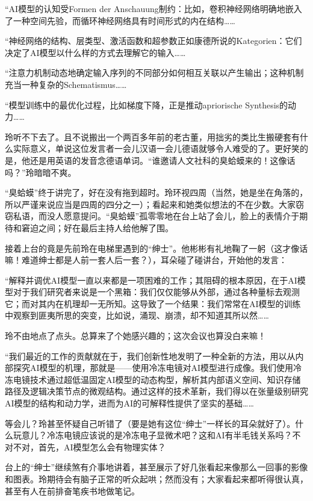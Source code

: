 “AI模型的认知受Formen der Anschauung制约：比如，卷积神经网络明确地嵌入了一种空间先验，而循环神经网络具有时间形式的内在结构……

“神经网络的结构、层类型、激活函数和超参数正如康德所说的Kategorien：它们决定了AI模型以什么样的方式去理解它的输入……

“注意力机制动态地确定输入序列的不同部分如何相互关联以产生输出；这种机制充当一种复杂的Schematismus……

“模型训练中的最优化过程，比如梯度下降，正是推动apriorische Synthesis的动力……

玲听不下去了。且不说搬出一个两百多年前的老古董，用拙劣的类比生搬硬套有什么实际意义，单说这位发言者一会儿汉语一会儿德语就够令人难受的了。更好笑的是，他还是用英语的发音念德语单词。“谁邀请人文社科的臭蛤蟆来的！这像话吗？”玲暗暗不爽。

“臭蛤蟆”终于讲完了，好在没有拖到超时。玲环视四周（当然，她是坐在角落的，所以严谨来说应当是四周的四分之一）；看起来和她类似想法的不在少数。大家窃窃私语，而没人愿意提问。“臭蛤蟆”孤零零地在台上站了会儿，脸上的表情介于期待和窘迫之间；好在最后主持人给他解了围。

接着上台的竟是先前玲在电梯里遇到的“绅士”。他彬彬有礼地鞠了一躬（这才像话嘛！难道绅士都是人前一套人后一套？），耳朵碰了碰讲台，开始他的发言：

“解释并调优AI模型一直以来都是一项困难的工作；其阻碍的根本原因，在于AI模型对于我们研究者来说是一个黑箱：我们仅仅能够从外部，通过各种量标去观测它；而对其内在机理却一无所知。这导致了一个结果：我们常常在AI模型的训练中观察到匪夷所思的突变，比如说，涌现、崩溃，却不知道其所以然……

玲不由地点了点头。总算来了个她感兴趣的；这次会议也算没白来嘛！

“我们最近的工作的贡献就在于，我们创新性地发明了一种全新的方法，用以从内部探究AI模型的机理，那就是——使用冷冻电镜对AI模型进行成像。我们使用冷冻电镜技术通过超低温固定AI模型的动态构型，解析其内部语义空间、知识存储路径及逻辑决策节点的微观结构。通过这样的技术革新，我们得以在张量级别研究AI模型的结构和动力学，进而为AI的可解释性提供了坚实的基础……

等会儿？玲甚至怀疑自己听错了（要是她有这位“绅士”一样长的耳朵就好了）。什么玩意儿？冷冻电镜应该说的是冷冻电子显微术吧？这和AI有半毛钱关系吗？不对不对，首先，AI模型怎么会有物理实体？

台上的“绅士”继续煞有介事地讲着，甚至展示了好几张看起来像那么一回事的影像和图表。玲期待会有脑子正常的听众起哄；然而没有；大家看起来都听得很认真，甚至有人在前排奋笔疾书地做笔记。

